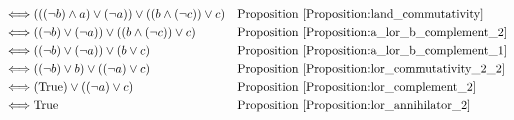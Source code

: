 \begin{prop}
\begin{align*}
\iff & (((\lnot b) \land a) \lor (\lnot a)) \lor ((b \land (\lnot c)) \lor c)
& & \text{Proposition \ref{Proposition:land_commutativity}} \\
\iff & ((\lnot b) \lor (\lnot a)) \lor ((b \land (\lnot c)) \lor c)
& & \text{Proposition \ref{Proposition:a_lor_b_complement_2}} \\
\iff & ((\lnot b) \lor (\lnot a)) \lor (b \lor c)
& & \text{Proposition \ref{Proposition:a_lor_b_complement_1}} \\
\iff & ((\lnot b) \lor b) \lor ((\lnot a) \lor c)
& & \text{Proposition \ref{Proposition:lor_commutativity_2_2}} \\
\iff & (\text{True}) \lor ((\lnot a) \lor c)
& & \text{Proposition \ref{Proposition:lor_complement_2}} \\
\iff & \text{True}
& & \text{Proposition \ref{Proposition:lor_annihilator_2}} \\
\end{align*}
\end{prop}

